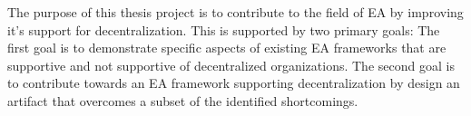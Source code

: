 The purpose of this thesis project is to contribute to the field of EA by improving it's support for decentralization. This is supported by two primary goals: The first goal is to demonstrate specific aspects of existing EA frameworks that are supportive and not supportive of decentralized organizations. The second goal is to contribute towards an EA framework supporting decentralization by design an artifact that overcomes a subset of the identified shortcomings.